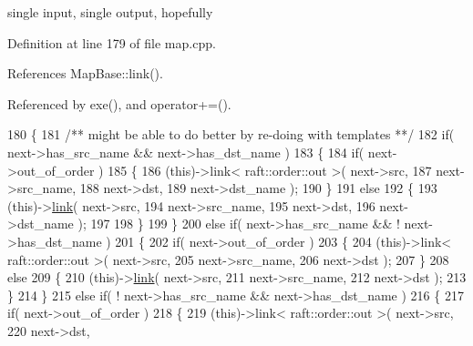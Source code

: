single input, single output, hopefully 

Definition at line 179 of file map.\+cpp.



References Map\+Base\+::link().



Referenced by exe(), and operator+=().


\begin{DoxyCode}
180 \{\textcolor{comment}{}
181 \textcolor{comment}{        /** might be able to do better by re-doing with templates **/}
182         \textcolor{keywordflow}{if}( next->has\_src\_name && next->has\_dst\_name )
183         \{
184             \textcolor{keywordflow}{if}( next->out\_of\_order )
185             \{
186                 (\textcolor{keyword}{this})->link< raft::order::out >( next->src,
187                                                   next->src\_name,
188                                                   next->dst,
189                                                   next->dst\_name );
190             \}
191             \textcolor{keywordflow}{else}
192             \{
193                 (\textcolor{keyword}{this})->\hyperlink{class_map_base_ad98ef02c1651130ad6b565ad156b97c1}{link}( next->src,
194                               next->src\_name,
195                               next->dst,
196                               next->dst\_name );
197 
198             \}
199         \}
200         \textcolor{keywordflow}{else} \textcolor{keywordflow}{if}( next->has\_src\_name && ! next->has\_dst\_name )
201         \{
202             \textcolor{keywordflow}{if}( next->out\_of\_order )
203             \{
204                 (\textcolor{keyword}{this})->link< raft::order::out >( next->src,
205                                                   next->src\_name,
206                                                   next->dst );
207             \}
208             \textcolor{keywordflow}{else}
209             \{
210                 (\textcolor{keyword}{this})->\hyperlink{class_map_base_ad98ef02c1651130ad6b565ad156b97c1}{link}( next->src,
211                               next->src\_name,
212                               next->dst );
213             \}
214         \}
215         \textcolor{keywordflow}{else} \textcolor{keywordflow}{if}( ! next->has\_src\_name && next->has\_dst\_name )
216         \{
217             \textcolor{keywordflow}{if}( next->out\_of\_order )
218             \{
219                 (\textcolor{keyword}{this})->link< raft::order::out >( next->src,
220                                                   next->dst,

\end{DoxyCode}
